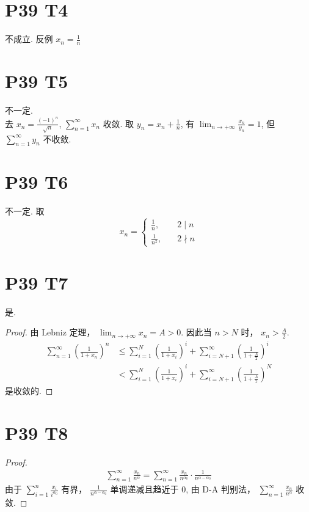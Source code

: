 \documentclass{article}
\newcommand{\sif}{\sum_{n = 1}^{\infty}}
\newcommand{\nti}{\lim_{n \to +\infty}}
\begin{document}
\section*{P39 T4}

不成立. 反例 $x_n = \frac{1}{n}$ \\

\section*{P39 T5}

不一定. \\
去 $x_n = \frac{(-1)^n}{\sqrt{n}}$, $\sif x_n$ 收敛. 取 $y_n = x_n + \frac{1}{n}$, 有 $\nti \frac{x_n}{y_n} = 1$, 但 $\sif y_n$ 不收敛.

\section*{P39 T6}

不一定. 取 
\[
    x_n = \begin{cases}
        \frac{1}{n},\quad & 2 \mid n \\
        \frac{1}{n^2}, \quad & 2 \nmid n
    \end{cases}
\]

\section*{P39 T7}

是.
\begin{proof}
    由 Lebniz 定理， $\nti x_n = A > 0$. 因此当 $n > N$ 时， $x_n > \frac{A}{2}$. 
    \begin{align*}
        \sif \left(\frac{1}{1 + x_n}\right)^n & \leqslant \sum_{i = 1}^{N}\left(\frac{1}{1 + x_i}\right)^i + \sum_{i = N + 1}^{\infty}\left(\frac{1}{1 + \frac{A}{2}}\right)^i \\
        & < \sum_{i = 1}^{N}\left(\frac{1}{1 + x_i}\right)^i + \sum_{i = N + 1}^{\infty}\left(\frac{1}{1 + \frac{A}{2}}\right)^N
    \end{align*}
    是收敛的.
\end{proof}

\section*{P39 T8}

\begin{proof}
    \begin{align*}
        \sif \frac{x_n}{n^\alpha} = \sif \frac{x_n}{n^{\alpha_0}}\cdot\frac{1}{n^{\alpha - \alpha_0}}
    \end{align*}
    由于 $\sum_{i = 1}^{n} \frac{x_i}{i^{\alpha_0}}$ 有界， $\frac{1}{n^{\alpha - \alpha_0}}$ 单调递减且趋近于 $0$, 由 D-A 判别法， $\sif \frac{x_n}{n^\alpha}$ 收敛.
\end{proof}
\end{document}
